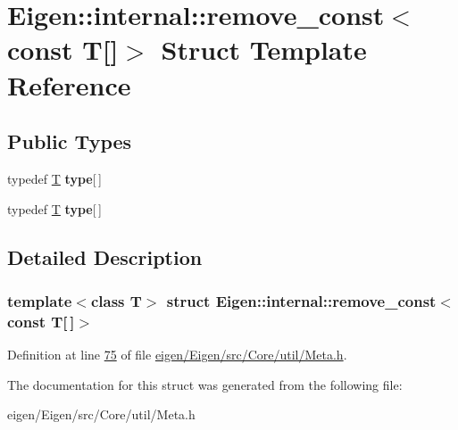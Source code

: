 \hypertarget{struct_eigen_1_1internal_1_1remove__const_3_01const_01_t[]_4}{}\section{Eigen\+:\+:internal\+:\+:remove\+\_\+const$<$ const T\mbox{[}\mbox{]}$>$ Struct Template Reference}
\label{struct_eigen_1_1internal_1_1remove__const_3_01const_01_t[]_4}
\subsection*{Public Types}
\begin{DoxyCompactItemize}
\item 
\mbox{\label{struct_eigen_1_1internal_1_1remove__const_3_01const_01_t[]_4_a61cf8ec377f9c0ec5bb13fd276996a73}} 
typedef \hyperlink{group___sparse_core___module}{T} {\bfseries type}\mbox{[}$\,$\mbox{]}
\item 
\mbox{\label{struct_eigen_1_1internal_1_1remove__const_3_01const_01_t[]_4_a61cf8ec377f9c0ec5bb13fd276996a73}} 
typedef \hyperlink{group___sparse_core___module}{T} {\bfseries type}\mbox{[}$\,$\mbox{]}
\end{DoxyCompactItemize}


\subsection{Detailed Description}
\subsubsection*{template$<$class T$>$\newline
struct Eigen\+::internal\+::remove\+\_\+const$<$ const T\mbox{[}$\,$\mbox{]}$>$}



Definition at line \hyperlink{eigen_2_eigen_2src_2_core_2util_2_meta_8h_source_l00075}{75} of file \hyperlink{eigen_2_eigen_2src_2_core_2util_2_meta_8h_source}{eigen/\+Eigen/src/\+Core/util/\+Meta.\+h}.



The documentation for this struct was generated from the following file\+:\begin{DoxyCompactItemize}
\item 
eigen/\+Eigen/src/\+Core/util/\+Meta.\+h\end{DoxyCompactItemize}

